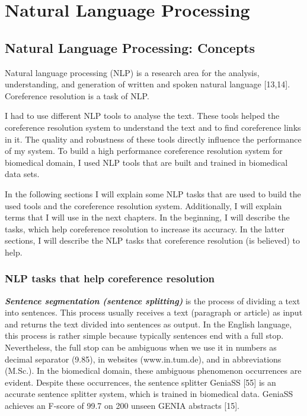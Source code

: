 \chapter{Natural Language Processing}
\label{chapter:Natural Language Processing}
\section{Natural Language Processing: Concepts}

Natural language processing (NLP) is a research area for the analysis, understanding, and generation of written and spoken natural language [13,14]. Coreference resolution is a task of NLP.

I had to use different NLP tools to analyse the text. These tools helped  the coreference resolution system to understand the text and to find coreference links in it. The quality and robustness of these tools directly influence the performance of my system. To build a high performance coreference resolution system for biomedical domain, I used NLP tools that are built and trained in biomedical data sets.

In the following sections I will explain some NLP tasks that are used to build the used tools and the coreference resolution system. Additionally, I will explain terms that I will use in the next chapters. In the beginning, I will describe the tasks, which help coreference resolution to increase its accuracy. In the latter sections, I will describe the NLP tasks that coreference resolution (is believed) to help.

\subsection{NLP tasks that help coreference resolution}

\emph{ \textbf{ Sentence segmentation (sentence splitting)}} is the process of dividing a text into sentences. This process usually receives a text (paragraph or article) as input and returns the text divided into sentences as output.
In the English language, this process is rather simple because typically sentences end with a full stop. Nevertheless, the full stop can be ambiguous when we use it in numbers as decimal separator (9.85), in websites (www.in.tum.de), and in abbreviations (M.Sc.). In the biomedical domain, these ambiguous phenomenon occurrences are evident.
Despite these occurrences, the sentence splitter GeniaSS [55] is an accurate sentence splitter system, which is trained in biomedical data. GeniaSS achieves an F-score of 99.7 on 200 unseen GENIA abstracts [15].\\

